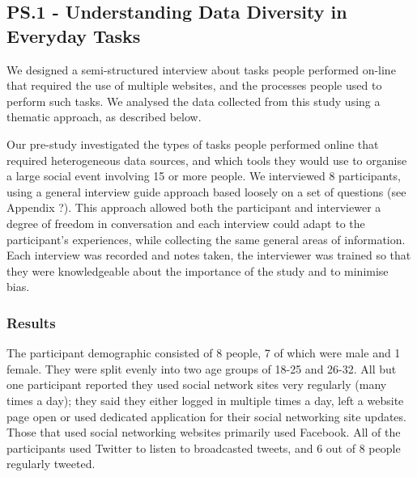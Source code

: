 \documentclass{sigchi}
\begin{document}
\subsection{PS.1 - Understanding Data Diversity in Everyday Tasks}
We designed a semi-structured interview about tasks people performed on-line that required the use of multiple websites, and the processes people used to perform such tasks.  We analysed the data collected from this study using a thematic approach, as described below. 

Our pre-study investigated the types of tasks people performed online that required heterogeneous data sources, and which tools they would use to organise a large social event involving 15 or more people.  We interviewed 8 participants, using a general interview guide approach based loosely on a set of questions (see Appendix ?).  This approach allowed both the participant and interviewer a degree of freedom in conversation and each interview could adapt to the participant's experiences, while collecting the same general areas of information.  Each interview was recorded and notes taken, the interviewer was trained so that they were knowledgeable about the importance of the study and to minimise bias.

\subsubsection{Results}
The participant demographic consisted of 8 people, 7 of which were male and 1 female.  They were split evenly into two age groups of 18-25 and 26-32.  All but one participant reported they used social network sites very regularly (many times a day); they said they either logged in multiple times a day, left a website page open or used dedicated application for their social networking site updates.  Those that used social networking websites primarily used Facebook.  All of the participants used Twitter to listen to broadcasted tweets, and 6 out of 8 people regularly tweeted. 
\end{document}
